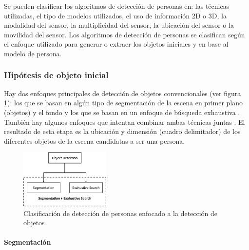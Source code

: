 Se pueden clasificar los algoritmos de detección de personas en: las técnicas utilizadas, el tipo de modelos utilizados, el uso de información 2D o 3D, la modalidad del sensor, la multiplicidad del sensor, la ubicación del sensor o la movilidad del sensor. Los algoritmos de detección de personas se clasifican según el enfoque utilizado para generar o extraer los objetos iniciales y en base al modelo de persona.

\subsubsection*{Hipótesis de objeto inicial}
\label{subsubsec:hipotesis-inicial-deteccion-personas-objetos}

Hay dos enfoques principales de detección de objetos convencionales (ver figura \ref{fig:people-detection-classification}): los que se basan en algún tipo de segmentación de la escena en primer plano (objetos) y el fondo \cite{868681} y los que se basan en un enfoque de búsqueda exhaustiva \cite{4408936}. También hay algunos enfoques que intentan combinar ambas técnicas juntas \cite{4220664}. El resultado de esta etapa es la ubicación y dimensión (cuadro delimitador) de los diferentes objetos de la escena candidatas a ser una persona.

\begin{figure}[ht]
\centering
\includegraphics[width=0.4\textwidth]{img/chapters/estado-del-arte/people-detection-classification.png}
\caption{\label{fig:people-detection-classification}Clasificación de detección de personas enfocado a la detección de objetos \cite{https://doi.org/10.1049/iet-cvi.2014.0148}}
\end{figure}

\paragraph*{Segmentación}\mbox{} \\
\label{parag:deteccion-objetos-personas-segmentacion}

